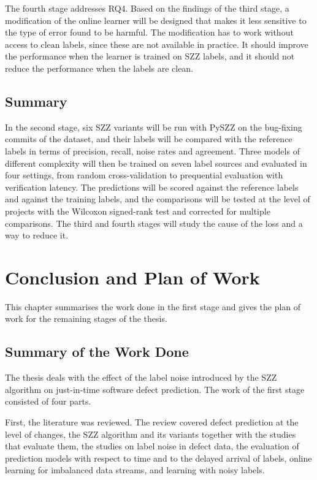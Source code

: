 \documentclass[12pt,a4paper,oneside]{report}
\begin{document}
The fourth stage addresses RQ4. Based on the findings of the third stage, a
modification of the online learner will be designed that makes it less
sensitive to the type of error found to be harmful. The modification has to
work without access to clean labels, since these are not available in
practice. It should improve the performance when the learner is trained on
SZZ labels, and it should not reduce the performance when the labels are
clean.

\section{Summary}

In the second stage, six SZZ variants will be run with PySZZ on the
bug-fixing commits of the dataset, and their labels will be compared with the
reference labels in terms of precision, recall, noise rates and agreement.
Three models of different complexity will then be trained on seven label
sources and evaluated in four settings, from random cross-validation to
prequential evaluation with verification latency. The predictions will be
scored against the reference labels and against the training labels, and the
comparisons will be tested at the level of projects with the Wilcoxon
signed-rank test and corrected for multiple comparisons. The third and fourth
stages will study the cause of the loss and a way to reduce it.

\chapter{Conclusion and Plan of Work}\label{ch:conclusion}

This chapter summarises the work done in the first stage and gives the plan
of work for the remaining stages of the thesis.

\section{Summary of the Work Done}

The thesis deals with the effect of the label noise introduced by the SZZ
algorithm on just-in-time software defect prediction. The work of the first
stage consisted of four parts.

First, the literature was reviewed. The review covered defect prediction at
the level of changes, the SZZ algorithm and its variants together with the
studies that evaluate them, the studies on label noise in defect data, the
evaluation of prediction models with respect to time and to the delayed
arrival of labels, online learning for imbalanced data streams, and learning
with noisy labels.
\end{document}
